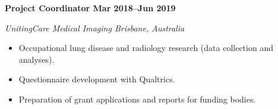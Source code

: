 \textbf{Project Coordinator \hfill Mar 2018--Jun 2019}\par
\textit{UnitingCare Medical Imaging \hfill Brisbane, Australia}\par
\begin{itemize}
    \item Occupational lung disease and radiology research (data collection and analyses).
	\item Questionnaire development with Qualtrics.
    \item Preparation of grant applications and reports for funding bodies.
\end{itemize}\par